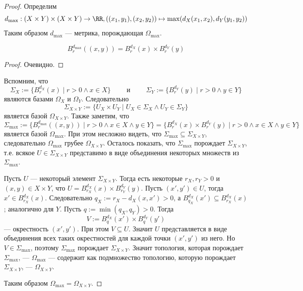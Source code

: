 \documentclass[12pt,a4paper]{article}
\begin{document}
    \begin{proof}
        Определим
        \[d_{\max}: (X \times Y) \times (X \times Y) \to \RR, ((x_1, y_1), (x_2, y_2)) \mapsto \max(d_X(x_1, x_2), d_Y(y_1, y_2))\]
        Таким образом $d_{\max}$ --- метрика, порождающая $\Omega_{\max}$.

        \begin{thlemma}
            \[B_r^{d_{\max}}((x, y)) = B_r^{d_X}(x) \times B_r^{d_Y}(y)\]
        \end{thlemma}

        \begin{proof}
            Очевидно.
        \end{proof}

        Вспомним, что
        \[
            \Sigma_X := \{B_r^{d_X}(x) \mid r > 0 \wedge x \in X\}
            \qquad \text{ и } \qquad
            \Sigma_Y := \{B_r^{d_Y}(y) \mid r > 0 \wedge y \in Y\}
        \]
        являются базами $\Omega_X$ и $\Omega_Y$. Следовательно
        \[\Sigma_{X \times Y} := \{U_X \times U_Y \mid U_X \in \Sigma_X \wedge U_Y \in \Sigma_Y\}\]
        является базой $\Omega_{X \times Y}$. Также заметим, что
        \[\Sigma_{\max} := \{B_r^{d_{\max}}((x, y)) \mid r > 0 \wedge x \in X \wedge y \in Y\} = \{B_r^{d_X}(x) \times B_r^{d_Y}(y) \mid r > 0 \wedge x \in X \wedge y \in Y\}\]
        является базой $\Omega_{\max}$. При этом несложно видеть, что $\Sigma_{\max} \subseteq \Sigma_{X \times Y}$, следовательно $\Omega_{\max}$ грубее $\Omega_{X \times Y}$. Осталось показать, что $\Sigma_{\max}$ порождает $\Sigma_{X \times Y}$, т.е. всякое $U \in \Sigma_{X \times Y}$ представимо в виде объединения некоторых множеств из $\Sigma_{\max}$.

        Пусть $U$ --- некоторый элемент $\Sigma_{X \times Y}$. Тогда есть некоторые $r_X, r_Y > 0$ и $(x, y) \in X \times Y$, что $U = B_{r_X}^{d_X}(x) \times B_{r_Y}^{d_Y}(y)$. Пусть $(x', y') \in U$, тогда $x' \in B_{r_X}^{d_X}(x)$. Следовательно $q_X := r_X - d_X(x, x') > 0$, а $B_{q_X}^{d_X}(x') \subseteq B_{r_X}^{d_X}(x)$; аналогично для $Y$. Пусть $q := \min(q_X, q_Y) > 0$. Тогда
        \[V := B_q^{d_X}(x') \times B_q^{d_Y}(y')\]
        --- окрестность $(x', y')$. При этом $V \subseteq U$. Значит $U$ представляется в виде объединения всех таких окрестностей для каждой точки $(x', y')$ из него. Но $V \in \Sigma_{\max}$, поэтому $\Sigma_{\max}$ порождает $\Sigma_{X \times Y}$. Значит топология, которая порождает $\Sigma_{\max}$, --- $\Omega_{\max}$ --- содержит как подмножество топологию, которую порождает $\Sigma_{X \times Y}$, --- $\Omega_{X \times Y}$.

        Таким образом $\Omega_{\max} = \Omega_{X \times Y}$.
    \end{proof}
\end{document}
